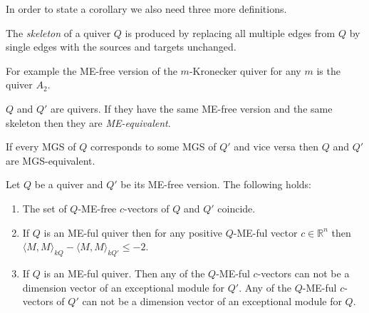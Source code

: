 \indent In order to state a corollary we also need three more definitions.
\begin{definition}
The \textit{skeleton} of a quiver $Q$ is produced by replacing all multiple edges from $Q$ by single edges with the sources and targets unchanged.\\
\end{definition}
\indent For example the ME-free version of the $m$-Kronecker quiver for any $m$ is the quiver $A_2$.
\begin{definition}
$Q$ and $Q'$ are quivers. If they have the same ME-free version and the same skeleton then they are \textit{ME-equivalent}.
\end{definition}
\begin{definition}
If every MGS of $Q$ corresponds to some MGS of $Q'$ and vice versa then $Q$ and $Q'$ are MGS-equivalent. 
\end{definition}
\begin{lemma}
\indent Let $Q$ be a quiver and $Q'$ be its ME-free version. The following holds:\label{L2}
\begin{enumerate}
\item The set of $Q$-ME-free $c$-vectors of $Q$ and $Q'$ coincide.
\item If $Q$ is an ME-ful quiver then for any positive $Q$-ME-ful vector $c\in\mathbb{R}^n$ then $\langle M,M\rangle_{kQ} - \langle M,M\rangle_{kQ'} \leq -2$.
\item If $Q$ is an ME-ful quiver. Then any of the $Q$-ME-ful $c$-vectors can not be a dimension vector of an exceptional module for $Q'$. Any of the $Q$-ME-ful $c$-vectors of $Q'$ can not be a dimension vector of an exceptional module for $Q$.
\end{enumerate}
\end{lemma}

